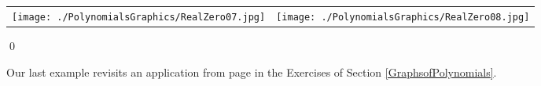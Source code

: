 \begin{ex}
\begin{enumerate}
\begin{center}

\begin{tabular}{cc}

\texttt{[image: ./PolynomialsGraphics/RealZero07.jpg]} \hspace{0.75in} & \texttt{[image: ./PolynomialsGraphics/RealZero08.jpg]}

\end{tabular}
\end{center} 

\qed
\end{enumerate}

\end{ex}

Our last example revisits an application from page \pageref{LCDmaxprofit} in the Exercises of Section \ref{GraphsofPolynomials}.

